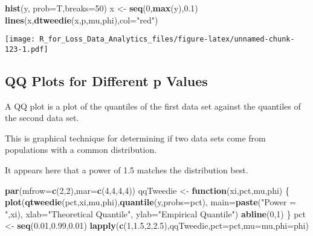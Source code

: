 \documentclass[]{book}
\newenvironment{Shaded}{\begin{snugshade}}{\end{snugshade}}
\newcommand{\KeywordTok}[1]{\textcolor[rgb]{0.13,0.29,0.53}{\textbf{#1}}}
\newcommand{\DataTypeTok}[1]{\textcolor[rgb]{0.13,0.29,0.53}{#1}}
\newcommand{\DecValTok}[1]{\textcolor[rgb]{0.00,0.00,0.81}{#1}}
\newcommand{\FloatTok}[1]{\textcolor[rgb]{0.00,0.00,0.81}{#1}}
\newcommand{\StringTok}[1]{\textcolor[rgb]{0.31,0.60,0.02}{#1}}
\newcommand{\ControlFlowTok}[1]{\textcolor[rgb]{0.13,0.29,0.53}{\textbf{#1}}}
\newcommand{\NormalTok}[1]{#1}
\theoremstyle{definition}
\theoremstyle{definition}
\theoremstyle{definition}
\theoremstyle{remark}
\begin{document}
\begin{Shaded}
\begin{Highlighting}[]
\KeywordTok{hist}\NormalTok{(y, }\DataTypeTok{prob=}\NormalTok{T,}\DataTypeTok{breaks=}\DecValTok{50}\NormalTok{)}
\NormalTok{x <-}\StringTok{ }\KeywordTok{seq}\NormalTok{(}\DecValTok{0}\NormalTok{,}\KeywordTok{max}\NormalTok{(y),}\FloatTok{0.1}\NormalTok{)}
\KeywordTok{lines}\NormalTok{(x,}\KeywordTok{dtweedie}\NormalTok{(x,p,mu,phi),}\DataTypeTok{col=}\StringTok{"red"}\NormalTok{)}
\end{Highlighting}
\end{Shaded}

\texttt{[image: R\_for\_Loss\_Data\_Analytics\_files/figure-latex/unnamed-chunk-123-1.pdf]}

\subsection{QQ Plots for Different p
Values}\label{qq-plots-for-different-p-values}

A QQ plot is a plot of the quantiles of the first data set against the
quantiles of the second data set.

This is graphical technique for determining if two data sets come from
populations with a common distribution.

It appears here that a power of 1.5 matches the distribution best.

\begin{Shaded}
\begin{Highlighting}[]
\KeywordTok{par}\NormalTok{(}\DataTypeTok{mfrow=}\KeywordTok{c}\NormalTok{(}\DecValTok{2}\NormalTok{,}\DecValTok{2}\NormalTok{),}\DataTypeTok{mar=}\KeywordTok{c}\NormalTok{(}\DecValTok{4}\NormalTok{,}\DecValTok{4}\NormalTok{,}\DecValTok{4}\NormalTok{,}\DecValTok{4}\NormalTok{))}
\NormalTok{qqTweedie <-}\StringTok{ }\ControlFlowTok{function}\NormalTok{(xi,pct,mu,phi) \{}
  \KeywordTok{plot}\NormalTok{(}\KeywordTok{qtweedie}\NormalTok{(pct,xi,mu,phi),}\KeywordTok{quantile}\NormalTok{(y,}\DataTypeTok{probs=}\NormalTok{pct),}
       \DataTypeTok{main=}\KeywordTok{paste}\NormalTok{(}\StringTok{"Power = "}\NormalTok{,xi), }\DataTypeTok{xlab=}\StringTok{"Theoretical Quantile"}\NormalTok{, }\DataTypeTok{ylab=}\StringTok{"Empirical Quantile"}\NormalTok{)}
  \KeywordTok{abline}\NormalTok{(}\DecValTok{0}\NormalTok{,}\DecValTok{1}\NormalTok{)}
\NormalTok{\}}
\NormalTok{pct <-}\StringTok{ }\KeywordTok{seq}\NormalTok{(}\FloatTok{0.01}\NormalTok{,}\FloatTok{0.99}\NormalTok{,}\FloatTok{0.01}\NormalTok{)}
\KeywordTok{lapply}\NormalTok{(}\KeywordTok{c}\NormalTok{(}\DecValTok{1}\NormalTok{,}\FloatTok{1.5}\NormalTok{,}\DecValTok{2}\NormalTok{,}\FloatTok{2.5}\NormalTok{),qqTweedie,}\DataTypeTok{pct=}\NormalTok{pct,}\DataTypeTok{mu=}\NormalTok{mu,}\DataTypeTok{phi=}\NormalTok{phi)}
\end{Highlighting}
\end{Shaded}
\end{document}
